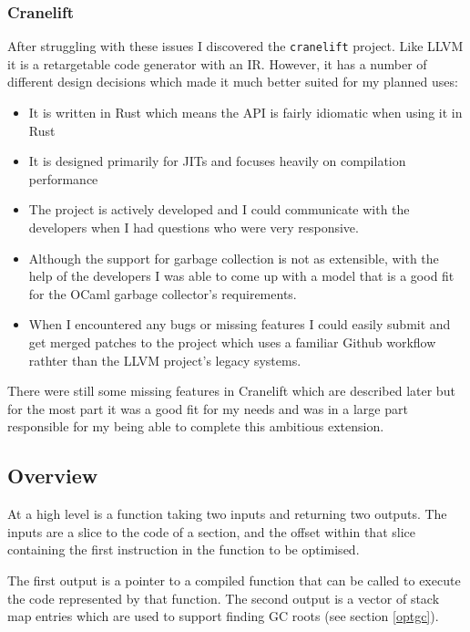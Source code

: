 \subsubsection{Cranelift}

After struggling with these issues I discovered the \texttt{cranelift} project. Like LLVM it is a
retargetable code generator with an IR. However, it has a number of different design decisions
which made it much better suited for my planned uses:

\begin{itemize}
      \item It is written in Rust which means the API is fairly idiomatic when using it in Rust
      \item It is designed primarily for JITs and focuses heavily on compilation performance
      \item The project is actively developed and I could communicate with the developers when I
            had
            questions who were very responsive.
      \item Although the support for garbage collection is not as extensible, with the help of the
            developers I was able to come up with a model that is a good fit for the OCaml garbage
            collector's
            requirements.
      \item When I encountered any bugs or missing features I could easily submit and get merged
            patches to the project which uses a familiar Github workflow rathter than the LLVM
            project's legacy
            systems.
\end{itemize}

There were still some missing features in Cranelift which are described later but for the most
part it was a good fit for my needs and was in a large part responsible for my being able to
complete this ambitious extension.

\subsection{Overview}

At a high level is a function taking two inputs and returning two outputs. The inputs are a slice
to the code of a section, and the offset within that slice containing the first instruction in the
function to be optimised.

The first output is a pointer to a compiled function that can be called to execute the code
represented by that function. The second output is a vector of stack map entries which are used to
support finding GC roots (see section \ref{optgc}).

